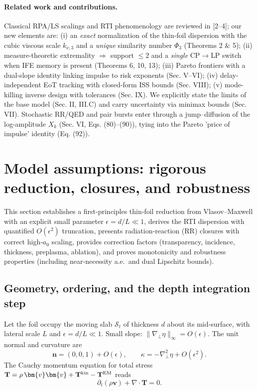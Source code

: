 \documentclass[aps,pre,twocolumn,showpacs,superscriptaddress]{revtex4-2}
\theoremstyle{definition}
\begin{document}
\paragraph*{Related work and contributions.}
Classical RPA/LS scalings and RTI phenomenology are reviewed in [2–4]; our new elements are:
(i) an \emph{exact} normalization of the thin-foil dispersion with the cubic viscous scale $k_{\nu,3}$ and a \emph{unique} similarity number $\Phi_3$ (Theorems 2 \& 5); 
(ii) measure-theoretic extremality $\Rightarrow$ support $\le2$ and a \emph{single} CP$\to$LP switch when IFE memory is present (Theorems 6, 10, 13); 
(iii) Pareto frontiers with a dual-slope identity linking impulse to risk exponents (Sec. V–VI); 
(iv) delay-independent EoT tracking with closed-form ISS bounds (Sec. VIII); 
(v) mode-killing inverse design with tolerances (Sec. IX). 
We explicitly state the limits of the base model (Sec. II, III.C) and carry uncertainty via minimax bounds (Sec. VII). Stochastic RR/QED and pair bursts enter through a jump–diffusion of the log-amplitude $X_k$ (Sec. VI, Eqs. (80)–(90)), tying into the Pareto 'price of impulse' identity (Eq. (92)).

\section{Model assumptions: rigorous reduction, closures, and robustness}\label{sec:assumptions}

This section establishes a first‑principles thin‑foil reduction from Vlasov–Maxwell with an explicit small parameter $\epsilon=d/L\ll1$, derives the RTI dispersion with quantified $O(\epsilon^2)$ truncation, presents radiation‑reaction (RR) closures with correct high‑$a_0$ scaling, provides correction factors (transparency, incidence, thickness, preplasma, ablation), and proves monotonicity and robustness properties (including near‑necessity a.e.\ and dual Lipschitz bounds).

\subsection{Geometry, ordering, and the depth integration step}\label{subsec:geom}

Let the foil occupy the moving slab $\mathcal{S}_t$ of thickness $d$ about its mid‑surface, with lateral scale $L$ and $\epsilon=d/L\ll1$. Small slope: $\|\nabla_\perp\eta\|_\infty=O(\epsilon)$. The unit normal and curvature are
\[
\bm{n}=(0,0,1)+O(\epsilon),\qquad \kappa=-\nabla_\perp^2\eta + O(\epsilon^2).
\]
The Cauchy momentum equation for total stress $\mathbf{T}=\rho\,\bm{v}\bm{v}+\mathbf{T}^{\rm kin}-\mathbf{T}^{\rm EM}$ reads
\begin{equation}\label{eq:Cauchy}
\partial_t(\rho \bm{v})+\nabla\!\cdot\!\mathbf{T}=0.
\end{equation}
\end{document}
